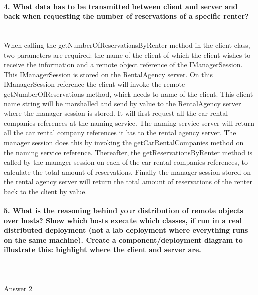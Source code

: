\documentclass{ds-report}
\begin{document}
	\paragraph{4. What data has to be transmitted between client and server and back when requesting the number of reservations of a specific renter?} \mbox{}\\
When calling the getNumberOfReservationsByRenter method in the client class, two parameters are required: the name of the client of which the client wishes to receive the information and a remote object reference of the IManagerSession. This IManagerSession is stored on the RentalAgency server. On this IManagerSession reference the client will invoke the remote getNumberOfReservations method, which needs to name of the client. This client name string will be marshalled and send by value to the RentalAgency server where the manager session is stored. It will first request all the car rental companies references at the naming service. The naming service server will return all the car rental company references it has to the rental agency server. The manager session does this by invoking the getCarRentalCompanies method on the naming service reference.
Thereafter, the getReservationsByRenter method is called by the manager session on each of the car rental companies references, to calculate the total amount of reservations. Finally the manager session stored on the rental agency server will return the total amount of reservations of the renter back to the client by value.   


	\paragraph{5. What is the reasoning behind your distribution of remote objects over hosts? Show which hosts execute which classes, if run in a real distributed deployment (not a lab deployment where
everything runs on the same machine). Create a component/deployment diagram to illustrate this:
highlight where the client and server are.} \mbox{}\\\\
	Answer 2
\end{document}
